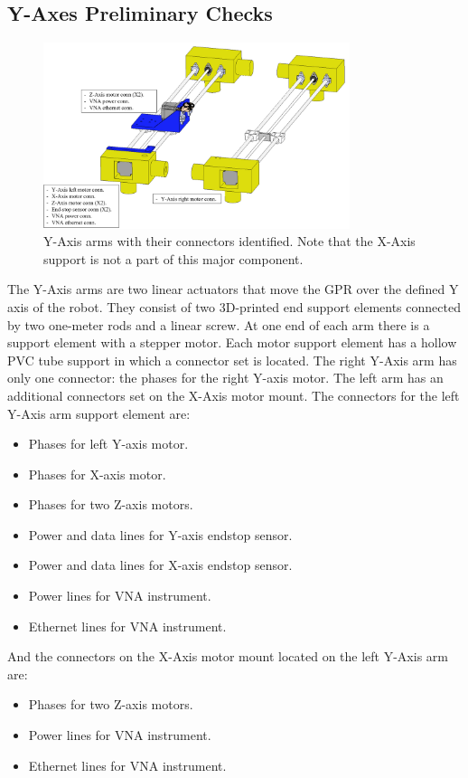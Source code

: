 \documentclass{article}
\begin{document}
\subsection{Y-Axes Preliminary Checks}
\begin{figure}[H]
    \centering
    \includegraphics[width=0.8\textwidth]{images/requirements/text_yaxes.png}
    \caption{Y-Axis arms with their connectors identified. Note that the X-Axis support is not a part of this major component.}
    \label{fig:considerations_y_arms_0}
\end{figure}
The Y-Axis arms are two linear actuators that move the GPR over the defined Y axis of the robot. They consist of two 3D-printed end support elements connected by two one-meter rods and a linear screw. At one end of each arm there is a support element with a stepper motor. Each motor support element has a hollow PVC tube support in which a connector set is located. The right Y-Axis arm has only one connector: the phases for the right Y-axis motor. The left arm has an additional connectors set on the X-Axis motor mount. The connectors for the left Y-Axis arm support element are:
\begin{itemize}
    \item Phases for left Y-axis motor.
    \item Phases for X-axis motor.
    \item Phases for two Z-axis motors.
    \item Power and data lines for Y-axis endstop sensor.
    \item Power and data lines for X-axis endstop sensor.
    \item Power lines for VNA instrument.
    \item Ethernet lines for VNA instrument.
\end{itemize}
And the connectors on the X-Axis motor mount located on the left Y-Axis arm are:
\begin{itemize}
    \item Phases for two Z-axis motors.
    \item Power lines for VNA instrument.
    \item Ethernet lines for VNA instrument.
\end{itemize}
\end{document}
